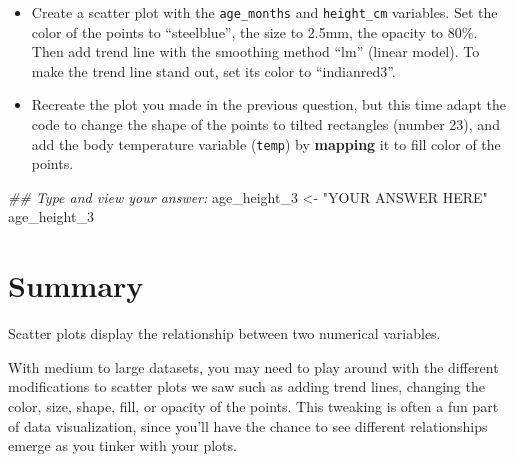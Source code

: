 \documentclass[
  letterpaper,
  DIV=11,
  numbers=noendperiod]{scrreprt}
\newenvironment{Shaded}{\begin{snugshade}}{\end{snugshade}}
\newcommand{\DocumentationTok}[1]{\textcolor[rgb]{0.37,0.37,0.37}{\textit{#1}}}
\newcommand{\NormalTok}[1]{\textcolor[rgb]{0.00,0.23,0.31}{#1}}
\newcommand{\OtherTok}[1]{\textcolor[rgb]{0.00,0.23,0.31}{#1}}
\newcommand{\StringTok}[1]{\textcolor[rgb]{0.13,0.47,0.30}{#1}}
\begin{document}
\begin{tcolorbox}[enhanced jigsaw, titlerule=0mm, colback=white, left=2mm, breakable, opacitybacktitle=0.6, colbacktitle=quarto-callout-tip-color!10!white, colframe=quarto-callout-tip-color-frame, bottomtitle=1mm, opacityback=0, coltitle=black, arc=.35mm, toptitle=1mm, title=\textcolor{quarto-callout-tip-color}{\faLightbulb}\hspace{0.5em}{Practice}, leftrule=.75mm, toprule=.15mm, bottomrule=.15mm, rightrule=.15mm]

\begin{itemize}
\item
  Create a scatter plot with the \texttt{age\_months} and
  \texttt{height\_cm} variables. Set the color of the points to
  ``steelblue'', the size to 2.5mm, the opacity to 80\%. Then add trend
  line with the smoothing method ``lm'' (linear model). To make the
  trend line stand out, set its color to ``indianred3''.
\item
  Recreate the plot you made in the previous question, but this time
  adapt the code to change the shape of the points to tilted rectangles
  (number 23), and add the body temperature variable (\texttt{temp}) by
  \textbf{mapping} it to fill color of the points.
\end{itemize}

\begin{Shaded}
\begin{Highlighting}[]
\DocumentationTok{\#\# Type and view your answer:}
\NormalTok{age\_height\_3 }\OtherTok{\textless{}{-}}  \StringTok{"YOUR ANSWER HERE"}
\NormalTok{age\_height\_3}
\end{Highlighting}
\end{Shaded}

\end{tcolorbox}

\section{Summary}\label{summary}

Scatter plots display the relationship between two numerical variables.

With medium to large datasets, you may need to play around with the
different modifications to scatter plots we saw such as adding trend
lines, changing the color, size, shape, fill, or opacity of the points.
This tweaking is often a fun part of data visualization, since you'll
have the chance to see different relationships emerge as you tinker with
your plots.
\end{document}
